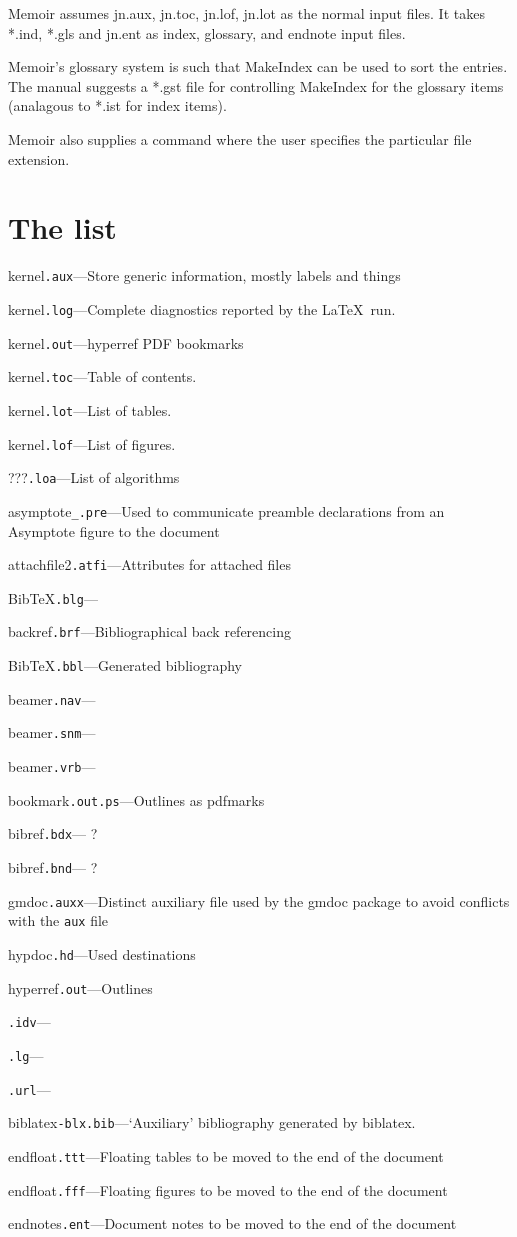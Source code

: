 \documentclass{article}
\newcommand\ext[1]{\texttt{#1}}
\newcommand\pkg[1]{\textsf{#1}}
\newcommand\EXT[3]{\noindent #1\quad\ext{#2}\quad---\quad#3\par}
\begin{document}
Memoir assumes jn.aux, jn.toc, jn.lof, jn.lot as the normal input files. It takes *.ind, *.gls and jn.ent as index, glossary, and endnote input files.

Memoir's glossary system is such that MakeIndex can be used to sort the entries. The manual suggests a *.gst file for controlling MakeIndex for the glossary items (analagous to *.ist for index items).

Memoir also supplies a \newlistof command where the user specifies the particular file extension.


\section{The list}

\EXT{kernel}{.aux}{Store generic information, mostly labels and things}
\EXT{kernel}{.log}{Complete diagnostics reported by the \LaTeX\ run.}
\EXT{kernel}{.out}{\pkg{hyperref} PDF bookmarks}
\EXT{kernel}{.toc}{Table of contents.}
\EXT{kernel}{.lot}{List of tables.}
\EXT{kernel}{.lof}{List of figures.}

\EXT{???}{.loa}{List of algorithms}

\EXT{asymptote}{_.pre}{Used to communicate preamble declarations from an \pkg{Asymptote} figure to the document}

\EXT{attachfile2}{.atfi}{Attributes for attached files}

\EXT{Bib\TeX}{.blg}{}
\EXT{backref}{.brf}{Bibliographical back referencing}
\EXT{Bib\TeX}{.bbl}{Generated bibliography}

\EXT{beamer}{.nav}{}
\EXT{beamer}{.snm}{}
\EXT{beamer}{.vrb}{}

\EXT{bookmark}{.out.ps}{Outlines as pdfmarks}

\EXT{bibref}{.bdx}{ ?}
\EXT{bibref}{.bnd}{ ?}

\EXT{gmdoc}{.auxx}{Distinct auxiliary file used by the \pkg{gmdoc} package to avoid conflicts with the \ext{aux} file}

\EXT{hypdoc}{.hd}{Used destinations}

\EXT{hyperref}{.out}{Outlines}

\EXT{}{.idv}{}
\EXT{}{.lg}{}

\EXT{}{.url}{}

\EXT{biblatex}{-blx.bib}{`Auxiliary' bibliography generated by \pkg{biblatex}.}

\EXT{endfloat}{.ttt}{Floating tables to be moved to the end of the document}
\EXT{endfloat}{.fff}{Floating figures to be moved to the end of the document}
\EXT{endnotes}{.ent}{Document notes to be moved to the end of the document}
\end{document}
